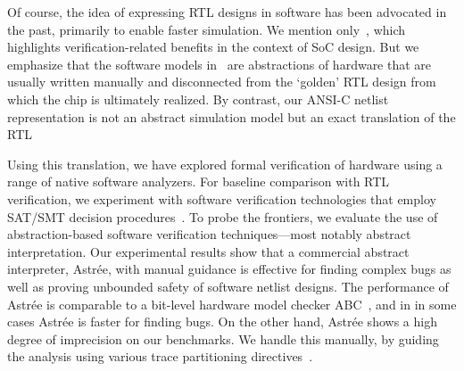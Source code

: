 Of course, the idea of expressing RTL designs in software has been  advocated in the past, primarily to enable faster simulation. We mention only~\cite{soc-keating}, which highlights verification-related benefits in the context of SoC design.  But we emphasize that the software models in~\cite{soc-keating} are abstractions of hardware that are usually written manually and disconnected from the `golden' RTL design  from which the chip is ultimately realized.  By contrast, our ANSI-C netlist representation is not an abstract simulation model but an exact translation of the RTL

Using this translation, we have explored formal verification of hardware using a range of 
native software analyzers.  For baseline comparison with RTL verification, we experiment with software verification technologies that employ SAT/SMT decision procedures~\cite{DBLP:conf/cav/BeyerK11,2ls,cbmc.tacas:2004,DBLP:conf/tacas/HeizmannDGLMSP16}. To 
probe the frontiers, we evaluate the use of abstraction-based software verification 
techniques---most notably abstract interpretation. Our experimental results show that a commercial abstract interpreter,  Astr{\'e}e, with manual guidance is effective for finding complex bugs 
as well as proving unbounded safety of software netlist designs. The performance of Astr{\'e}e is 
comparable to a bit-level hardware model checker ABC~\cite{abc}, and in 
in some cases Astr{\'e}e is faster for finding bugs.  On the other hand, 
Astr{\'e}e shows a high degree of imprecision on our benchmarks. We handle this 
manually, by guiding the analysis using various trace 
partitioning directives~\cite{DBLP:journals/toplas/RivalM07}.  
%


